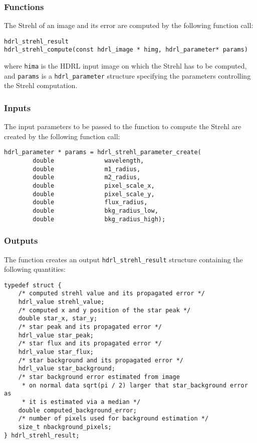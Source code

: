 \subsubsection{Functions}

The Strehl of an image and its error are computed by the following
function call:

\begin{lstlisting}
hdrl_strehl_result
hdrl_strehl_compute(const hdrl_image * himg, hdrl_parameter* params)

\end{lstlisting}
             
where \verb+hima+ is the HDRL input image on which the Strehl has to
be computed, and \verb+params+ is a \verb+hdrl_parameter+ structure
specifying the parameters controlling the Strehl computation.
           
\subsubsection{Inputs}
\label{sec:algorithms:strehl:inputs}
The input parameters to be passed to the function to compute the
Strehl are created by the following function call:

\begin{lstlisting}
hdrl_parameter * params = hdrl_strehl_parameter_create(
        double              wavelength, 
        double              m1_radius, 
        double              m2_radius, 
        double              pixel_scale_x, 
        double              pixel_scale_y, 
        double              flux_radius, 
        double              bkg_radius_low, 
        double              bkg_radius_high);
\end{lstlisting}

\subsubsection{Outputs}


The function creates an output \verb+hdrl_strehl_result+ structure
containing the following quantities:

\begin{lstlisting}
typedef struct {
    /* computed strehl value and its propagated error */
    hdrl_value strehl_value;
    /* computed x and y position of the star peak */
    double star_x, star_y;
    /* star peak and its propagated error */
    hdrl_value star_peak;
    /* star flux and its propagated error */
    hdrl_value star_flux;
    /* star background and its propagated error */
    hdrl_value star_background;
    /* star background error estimated from image
     * on normal data sqrt(pi / 2) larger that star_background error as 
     * it is estimated via a median */
    double computed_background_error;
    /* number of pixels used for background estimation */
    size_t nbackground_pixels;
} hdrl_strehl_result;
\end{lstlisting}

